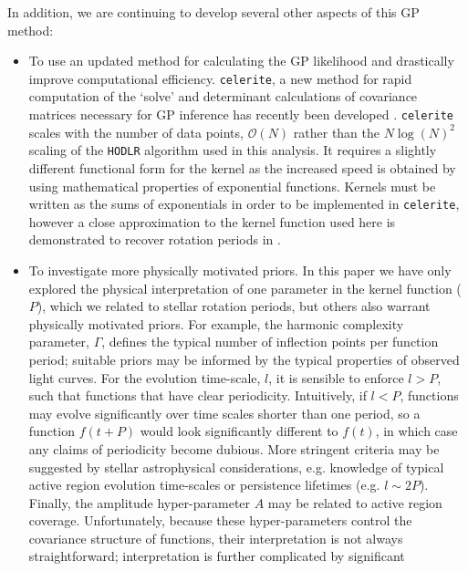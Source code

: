 \documentclass[a4paper,fleqn,usenatbib,useAMS]{mnras}
\newcommand{\response}[1]{{#1}}
\begin{document}
In addition, we are continuing to develop several other aspects of this GP
method:
\begin{itemize}
    \item{\response{To use an updated method for calculating the GP likelihood and
    drastically improve computational efficiency.
        {\tt celerite}, a new method for rapid computation of the `solve' and
        determinant calculations of covariance matrices necessary for GP
        inference has recently been developed \citep{Foremanmackey2017}.
        {\tt celerite} scales with the number of data points, $\mathcal{O}(N)$
        rather than the $N\log(N)^2$ scaling of the {\tt HODLR} algorithm used
        in this analysis.
        It requires a slightly different functional form for the kernel as the
        increased speed is obtained by using mathematical properties of
        exponential functions.
        Kernels must be written as the sums of exponentials in order to be
        implemented in {\tt celerite}, however a close approximation to the
        kernel function used here is demonstrated to recover rotation periods
        in \citet{Foremanmackey2017}.}}
\item{To investigate more physically motivated priors.
        In this paper we have only explored the physical interpretation of one
        parameter in the kernel function ($P$), which we related to stellar
        rotation periods, but others also warrant physically motivated priors.
        For example, the harmonic complexity parameter, $\Gamma$, defines the
        typical number of inflection points per function period; suitable
        priors may be informed by the typical properties of observed light
        curves.
        For the evolution time-scale, $l$,  it is sensible to enforce $l > P$,
        such that functions that have clear periodicity.
        Intuitively, if $l < P$, functions may evolve significantly over time
        scales shorter than one period, so a function $f(t+P)$ would look
        significantly different to $f(t)$, in which case any claims of
        periodicity become dubious.
        More stringent criteria may be suggested by stellar astrophysical
        considerations, e.g. knowledge of typical active region evolution
        time-scales or persistence lifetimes (e.g. $l\sim2P$).
        Finally, the amplitude hyper-parameter $A$ may be related to active
        region coverage.
        Unfortunately, because these hyper-parameters control the covariance
        structure of functions, their interpretation is not always
        straightforward; interpretation is further complicated by significant
}
\end{itemize}
\end{document}
